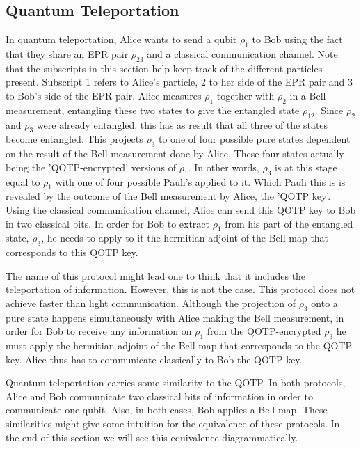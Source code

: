 \documentclass[]{article}
\begin{document}
\subsection{Quantum Teleportation}
\label{subsection:QuantumTeleportation}
In quantum teleportation, Alice wants to send a qubit $\rho_1$ to Bob using the fact that they share an EPR pair $\rho_{23}$ and a classical communication channel. Note that the subscripts in this section help keep track of the different particles present. Subscript 1 refers to Alice's particle, 2 to her side of the EPR pair and 3 to Bob's side of the EPR pair. Alice measures $\rho_1$ together with $\rho_{2}$ in a Bell measurement, entangling these two states to give the entangled state $\rho_{12}$. Since $\rho_2$ and $\rho_3$ were already entangled, this has as result that all three of the states become entangled. This projects $\rho_{3}$ to one of four possible pure states dependent on the result of the Bell measurement done by Alice. These four states actually being the 'QOTP-encrypted' versions of $\rho_1$. In other words, $\rho_{3}$ is at this stage equal to $\rho_1$ with one of four possible Pauli's applied to it. Which Pauli this is is revealed by the outcome of the Bell measurement by Alice, the 'QOTP key'. Using the classical communication channel, Alice can send this QOTP key to Bob in two classical bits. In order for Bob to extract  $\rho_1$ from his part of the entangled state, $\rho_{3}$, he needs to apply to it the hermitian adjoint of the Bell map that corresponds to this QOTP key.


The name of this protocol might lead one to think that it includes the teleportation of information. However, this is not the case. This protocol does not achieve faster than light communication. Although the projection of $\rho_{3}$ onto a pure state happens simultaneously with Alice making the Bell measurement, in order for Bob to receive any information on $\rho_1$ from the QOTP-encrypted $\rho_{3}$ he must apply the hermitian adjoint of the Bell map that corresponds to the QOTP key. Alice thus has to communicate classically to Bob the QOTP key.

Quantum teleportation carries some similarity to the QOTP. In both protocols, Alice and Bob communicate two classical bits of information in order to communicate one qubit. Also, in both cases, Bob applies a Bell map. These similarities might give some intuition for the equivalence of these protocols. In the end of this section we will see this equivalence diagrammatically.
\end{document}
